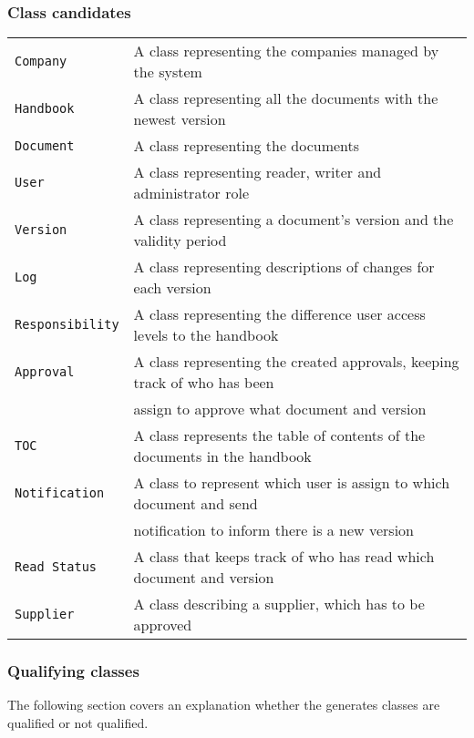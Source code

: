 \subsubsection{Class candidates} %
\begin{tabular}{l l}
	\texttt{Company} & A class representing the companies managed by the system \\
	\texttt{Handbook} & A class representing all the documents with the newest version\\
	\texttt{Document} & A class representing the documents\\ %
	\texttt{User }& A class representing reader, writer and administrator role\\
	\texttt{Version} & A class representing a document’s version and the validity period\\
	\texttt{Log} & A class representing descriptions of changes for each version\\ %
	\texttt{Responsibility} & A class representing the difference user access levels to the handbook\\ %
	\texttt{Approval} & A class representing the created approvals, keeping track of who has been\\&assign to approve what document and version\\  %
	\texttt{TOC} & A class represents the table of contents of the documents in the handbook\\ %
	\texttt{Notification} & A class to represent which user is assign to which document and send\\&notification to inform there is a new version\\ %
	\texttt{Read Status} & A class that keeps track of who has read which document and version\\
	\texttt{Supplier} & A class describing a supplier, which has to be approved %
\end{tabular}

\subsubsection{Qualifying classes}
The following section covers an explanation whether the generates classes are qualified or not qualified.

